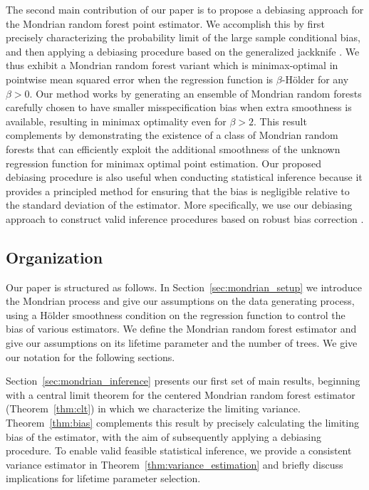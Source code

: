 The second main contribution of our paper is to propose a debiasing approach
for the Mondrian random forest point estimator.
We accomplish this by first precisely characterizing the probability limit
of the large sample conditional bias, and then applying a debiasing procedure
based on the generalized jackknife \citep{schucany1977improvement}.
We thus exhibit a Mondrian random forest variant which is minimax-optimal
in pointwise mean squared error when the
regression function is $\beta$-H{\"o}lder
for any $\beta > 0$.
Our method works by generating an ensemble of Mondrian random forests
carefully chosen to have smaller misspecification bias
when extra smoothness is available,
resulting in minimax optimality even for $\beta > 2$.
This result complements \citet{mourtada2020minimax} by demonstrating the
existence of a class of Mondrian random forests that can efficiently exploit
the additional smoothness of the unknown regression function for minimax
optimal point estimation.
Our proposed debiasing procedure is also useful when conducting
statistical inference because it provides a principled method
for ensuring that the bias is negligible relative
to the standard deviation of the estimator.
More specifically, we use our debiasing approach to construct
valid inference procedures based on robust bias correction
\citep{calonico2018jasa,calonico2022bernoulli}.

\subsection{Organization}

Our paper is structured as follows.
In Section~\ref{sec:mondrian_setup} we introduce the Mondrian process and give
our
assumptions on the data generating process,
using a H{\"o}lder smoothness condition on the regression function
to control the bias of various estimators.
We define the Mondrian random forest estimator and give our assumptions
on its lifetime parameter and the number of trees.
We give our notation for the following sections.

Section~\ref{sec:mondrian_inference} presents our first set of main results,
beginning with a central limit theorem for the centered Mondrian
random forest estimator (Theorem~\ref{thm:clt}) in which we
characterize the limiting variance.
Theorem~\ref{thm:bias} complements this result by
precisely calculating the limiting bias of the estimator,
with the aim of subsequently applying a debiasing procedure.
To enable valid feasible statistical inference,
we provide a consistent variance estimator
in Theorem~\ref{thm:variance_estimation}
and briefly discuss implications for lifetime parameter selection.

